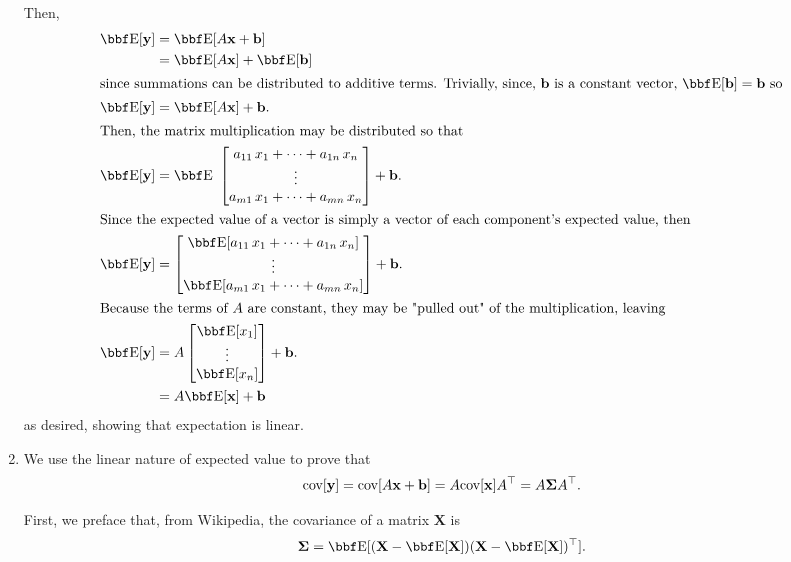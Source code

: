 \documentclass[12pt,letterpaper]{hmcpset}
\begin{document}
\begin{solution}
\begin{enumerate}
Then,
\begin{align}
\EE[\yy] &= \EE[A\xx + \bb]  \\
&= \EE[A\xx]  + \EE[\bb] \\
\intertext{since summations can be distributed to additive terms. Trivially, since, $\bb$ is a constant vector, $\EE[\bb] = \bb$ so}
\EE[\yy] &= \EE[A\xx]  + \bb. \\
\intertext{Then, the matrix multiplication may be distributed so that}
\EE[\yy] &= \EE   \  
	\begin{bmatrix}
    		a_{11} \, x_1  + \dots + a_{1n} \, x_n  \\
    		\vdots \\
    		a_{m1} \, x_1  + \dots + a_{mn} \, x_n \\
  	\end{bmatrix}
	+ \bb. \\
\intertext{Since the expected value of a vector is simply a vector of each component's expected value, then}
\EE[\yy] &=  
	\begin{bmatrix}
    		\EE[a_{11} \, x_1  + \dots + a_{1n} \, x_n ] \\
    		\vdots \\
    		\EE[a_{m1} \, x_1  + \dots + a_{mn} \, x_n ] \\
  	\end{bmatrix}
	+ \bb. \\
\intertext{Because the terms of $A$ are constant, they may be "pulled out" of the multiplication, leaving}
\EE[\yy] &=  A \begin{bmatrix}
    		\EE[x_1] \\
    		\vdots \\
    		\EE[x_n] \\
  	\end{bmatrix}
	+ \bb. \\
&=A \EE[\xx] + \bb
\end{align}
as desired, showing that expectation is linear.

\item
We use the linear nature of expected value to prove that
\[
    {\hbox{cov}}[{\bf y}] = {\hbox{cov}}[A{\bf x} + {\bf b}] = A {\hbox{cov}}[{\bf x}] A^\top = A\hbox{\boldmath$\Sigma$} A^\top.
\]

First, we preface that, from Wikipedia, the covariance of a matrix $\mathbf{X}$ is 
\[
\Sigmab = \EE[ (\mathbf{X} - \EE[\mathbf{X}])(\mathbf{X} - \EE[\mathbf{X}])^\T ].
\]


\end{enumerate}
\end{solution}
\end{document}

